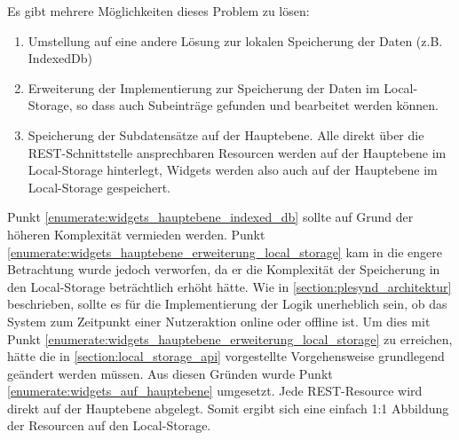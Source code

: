 Es gibt mehrere Möglichkeiten dieses Problem zu lösen:
\begin{enumerate}
 \item\label{enumerate:widgets_hauptebene_indexed_db} Umstellung auf eine andere Lösung zur lokalen Speicherung der Daten (z.B. IndexedDb)
 \item\label{enumerate:widgets_hauptebene_erweiterung_local_storage} Erweiterung der Implementierung zur Speicherung der Daten im Local-Storage, so dass auch Subeinträge gefunden und bearbeitet werden können.
 \item\label{enumerate:widgets_auf_hauptebene} Speicherung der Subdatensätze auf der Hauptebene. Alle direkt über die REST-Schnittstelle ansprechbaren Resourcen werden auf der Hauptebene im Local-Storage hinterlegt, Widgets werden also auch auf der Hauptebene im Local-Storage gespeichert.
\end{enumerate}
Punkt \ref{enumerate:widgets_hauptebene_indexed_db} sollte auf Grund der höheren Komplexität vermieden werden. Punkt \ref{enumerate:widgets_hauptebene_erweiterung_local_storage} kam in die engere Betrachtung wurde jedoch verworfen, da er die Komplexität der Speicherung in den Local-Storage beträchtlich erhöht hätte. Wie in \ref{section:plesynd_architektur} beschrieben, sollte es für die Implementierung der Logik unerheblich sein, ob das System zum Zeitpunkt einer Nutzeraktion online oder offline ist. Um dies mit Punkt \ref{enumerate:widgets_hauptebene_erweiterung_local_storage} zu erreichen, hätte die in \ref{section:local_storage_api} vorgestellte Vorgehensweise grundlegend geändert werden müssen. Aus diesen Gründen wurde Punkt \ref{enumerate:widgets_auf_hauptebene} umgesetzt. Jede REST-Resource wird direkt auf der Hauptebene abgelegt. Somit ergibt sich eine einfach 1:1 Abbildung der Resourcen auf den Local-Storage. 

